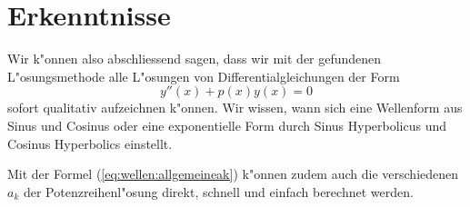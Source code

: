 \section{Erkenntnisse}
Wir k"onnen also abschliessend sagen, dass wir mit der gefundenen 
L"osungsmethode alle L"osungen von Differentialgleichungen der Form 
\begin{equation*}
	y''(x)+p(x)y(x) = 0
\end{equation*}
sofort qualitativ aufzeichnen k"onnen. Wir wissen, wann sich eine Wellenform 
aus Sinus und Cosinus oder eine exponentielle Form durch Sinus Hyperbolicus und 
Cosinus Hyperbolics einstellt.

Mit der Formel (\ref{eq:wellen:allgemeineak}) k"onnen zudem auch die 
verschiedenen $a_k$ der Potenzreihenl"osung direkt, schnell und einfach 
berechnet werden.
